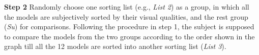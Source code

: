 \textbf{Step 2} Randomly choose one sorting list (e.g., \textit{List 2}) as a group, in which all the models are subjectively sorted by their visual qualities, and the rest group (\textit{Su})  for comparisons. Following the procedure in step 1, the subject is supposed to compare the models from the two groups according to the order shown in the graph till all the 12 models are sorted into another sorting list (\textit{List 3}).